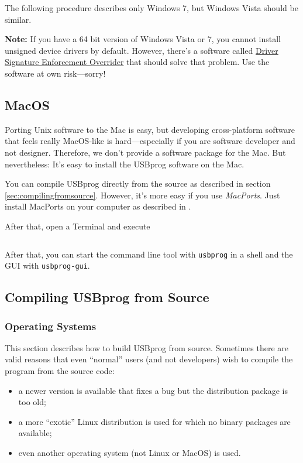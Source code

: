\documentclass[bibtotoc,UKenglish,halfparskip,oneside,DIV12]{scrreprt}
\begin{document}
The following procedure describes only Windows 7, but Windows Vista should be similar.

\textbf{Note:} If you have a 64 bit version of Windows Vista or 7, you cannot install unsigned
device drivers by default. However, there's a software called
\href{http://www.ngohq.com/home.php?page=dseo}{Driver Signature Enforcement
Overrider} that should solve that problem. Use the software at own risk---sorry!


\subsection{MacOS}

Porting Unix software to the Mac is easy, but developing cross-platform software that feels really
MacOS-like is hard---especially if you are software developer and not designer.  Therefore, we don't
provide a software package for the Mac. But nevertheless: It's easy to install the USBprog software
on the Mac.

You can compile USBprog directly from the source as described in section
\vref{sec:compilingfromsource}. However, it's more easy if you use \emph{MacPorts}. Just install
MacPorts on your computer as described in \cite{InstallingMacports}.

After that, open a Terminal and execute

\begin{lstlisting}[style=inline]
% sudo port install usbprog
\end{lstlisting}

After that, you can start the command line tool with \texttt{usbprog} in a shell and the GUI with
\texttt{usbprog-gui}.


\subsection{Compiling USBprog from Source}
\label{sec:compilingfromsource}

\subsubsection{Operating Systems}

This section describes how to build USBprog from source. Sometimes there are valid reasons that even
``normal'' users (and not developers) wish to compile the program from the source code:

\begin{itemize}
  \item a newer version is available that fixes a bug but the distribution package is too old;
  \item a more ``exotic'' Linux distribution is used for which no binary packages are available;
  \item even another operating system (not Linux or MacOS) is used.
\end{itemize}
\end{document}
